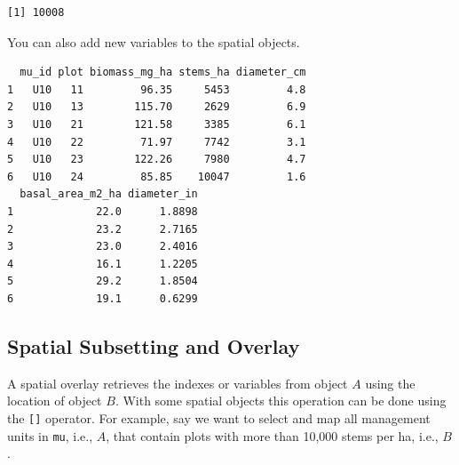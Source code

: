 \documentclass[]{krantz}
\makeatletter
\newenvironment{Shaded}{\begin{snugshade}}{\end{snugshade}}
\newcommand{\ErrorTok}[1]{\textcolor[rgb]{0.14,0.14,0.14}{\textbf{#1}}}
\newcommand{\FloatTok}[1]{\textcolor[rgb]{0.06,0.06,0.06}{#1}}
\newcommand{\KeywordTok}[1]{\textcolor[rgb]{0.27,0.27,0.27}{\textbf{#1}}}
\newcommand{\NormalTok}[1]{#1}
\newcommand{\OperatorTok}[1]{\textcolor[rgb]{0.43,0.43,0.43}{\textbf{#1}}}
\newcommand{\StringTok}[1]{\textcolor[rgb]{0.5,0.5,0.5}{#1}}
\newenvironment{kframe}{%
\medskip{}
\setlength{\fboxsep}{.8em}
 \def\at@end@of@kframe{}%
 \ifinner\ifhmode%
  \def\at@end@of@kframe{\end{minipage}}%
  \begin{minipage}{\columnwidth}%
 \fi\fi%
 \def\FrameCommand##1{\hskip\@totalleftmargin \hskip-\fboxsep
 \colorbox{shadecolor}{##1}\hskip-\fboxsep
     \hskip-\linewidth \hskip-\@totalleftmargin \hskip\columnwidth}%
 \MakeFramed {\advance\hsize-\width
   \@totalleftmargin\z@ \linewidth\hsize
   \@setminipage}}%
 {\par\unskip\endMakeFramed%
 \at@end@of@kframe}
\renewenvironment{Shaded}{\begin{kframe}}{\end{kframe}}
\makeatother
\begin{document}
\begin{verbatim}
[1] 10008
\end{verbatim}

You can also add new variables to the spatial objects.

\begin{Shaded}
\end{Shaded}

\begin{verbatim}
  mu_id plot biomass_mg_ha stems_ha diameter_cm
1   U10   11         96.35     5453         4.8
2   U10   13        115.70     2629         6.9
3   U10   21        121.58     3385         6.1
4   U10   22         71.97     7742         3.1
5   U10   23        122.26     7980         4.7
6   U10   24         85.85    10047         1.6
  basal_area_m2_ha diameter_in
1             22.0      1.8898
2             23.2      2.7165
3             23.0      2.4016
4             16.1      1.2205
5             29.2      1.8504
6             19.1      0.6299
\end{verbatim}

\hypertarget{spatial-subsetting-and-overlay}{%
\subsection{Spatial Subsetting and Overlay}\label{spatial-subsetting-and-overlay}}

A spatial overlay retrieves the indexes or variables from object \(A\) using the location of object \(B\). With some spatial objects this operation can be done using the \texttt{{[}{]}} operator. For example, say we want to select and map all management units in \texttt{mu}, i.e., \(A\), that contain plots with more than 10,000 stems per ha, i.e., \(B\).
\end{document}
